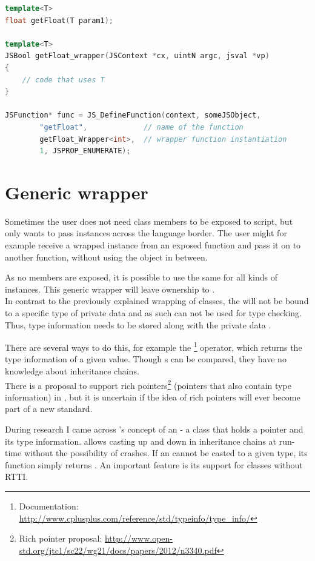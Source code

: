 \SingleSpacing
\begin{lstlisting}[language=C++, caption=A templated JSNative]
template<T>
float getFloat(T param1);

template<T>
JSBool getFloat_wrapper(JSContext *cx, uintN argc, jsval *vp)
{
	// code that uses T
}

JSFunction* func = JS_DefineFunction(context, someJSObject,
        "getFloat",             // name of the function
        getFloat_Wrapper<int>,  // wrapper function instantiation
        1, JSPROP_ENUMERATE);
\end{lstlisting}
\OnehalfSpacing

\section{Generic wrapper}
\label{sec:GenericWrapper}
Sometimes the user does not need class members to be exposed to script, but only wants to pass instances across the language border. The user might for example receive a wrapped instance from an exposed  function and pass it on to another  function, without using the  object in between.

As no members are exposed, it is possible to use the same  for all kinds of instances. This generic wrapper will leave ownership to .\\
In contrast to the previously explained wrapping of classes, the   will not be bound to a specific type of private data and as such can not be used for type checking. Thus, type information needs to be stored along with the private data .

There are several ways to do this, for example the  \footnote{Documentation: \url{http://www.cplusplus.com/reference/std/typeinfo/type_info/}} operator, which returns the type information of a given value. Though s can be compared, they have no knowledge about inheritance chains.\\
There is a proposal to support rich pointers\footnote{Rich pointer proposal: \url{http://www.open-std.org/jtc1/sc22/wg21/docs/papers/2012/n3340.pdf}} (pointers that also contain type information) in , but it is uncertain if the idea of rich pointers will ever become part of a new  standard.

During research I came across 's concept of an  - a class that holds a pointer and its type information.  allows casting up and down in inheritance chains at run-time without the possibility of crashes. If an  cannot be casted to a given type, its  function simply returns . An important feature is its support for classes without RTTI.

